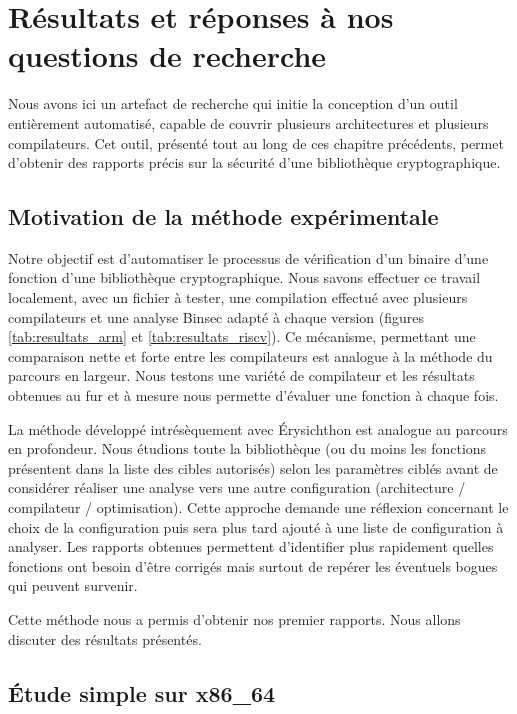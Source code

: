 \chapter{Résultats et réponses à nos questions de recherche}

Nous avons ici un artefact de recherche qui initie la conception d'un outil entièrement automatisé, capable de couvrir plusieurs architectures et plusieurs compilateurs. Cet outil, présenté tout au long de ces chapitre précédents, permet d'obtenir des rapports précis sur la sécurité d'une bibliothèque cryptographique. 

\section{Motivation de la méthode expérimentale}

Notre objectif est d'automatiser le processus de vérification d'un binaire d'une fonction d'une bibliothèque cryptographique. Nous savons effectuer ce travail localement, avec un fichier à tester, une compilation effectué avec plusieurs compilateurs et une analyse Binsec adapté à chaque version (\eg figures \ref{tab:resultats_arm} et \ref{tab:resultats_riscv}). Ce mécanisme, permettant une comparaison nette et forte entre les compilateurs est analogue à la méthode du parcours en largeur. Nous testons une variété de compilateur et les résultats obtenues au fur et à mesure nous permette d'évaluer une fonction à chaque fois.\medbreak

La méthode développé intrésèquement avec Érysichthon est analogue au parcours en profondeur. Nous étudions toute la bibliothèque (ou du moins les fonctions présentent dans la liste des cibles autorisés) selon les paramètres ciblés avant de considérer réaliser une analyse vers une autre configuration (architecture / compilateur / optimisation). Cette approche demande une réflexion concernant le choix de la configuration puis sera plus tard ajouté à une liste de configuration à analyser. Les rapports obtenues permettent d'identifier plus rapidement quelles fonctions ont besoin d'être corrigés mais surtout de repérer les éventuels bogues qui peuvent survenir.\smallbreak

Cette méthode nous a permis d'obtenir nos premier rapports. Nous allons discuter des résultats présentés.

\section{Étude simple sur x86\_64}

